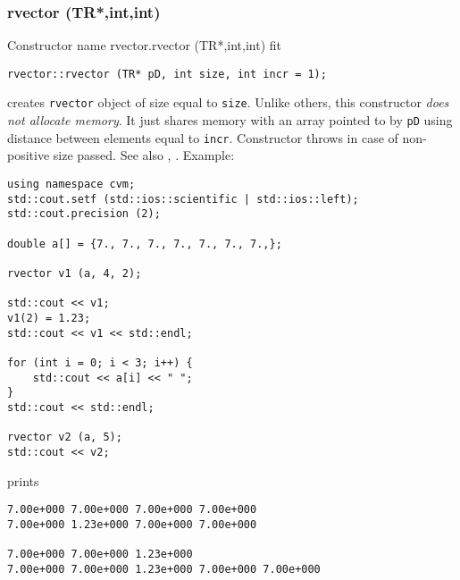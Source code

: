 \subsubsection{rvector (TR*,int,int)}
Constructor%
\pdfdest name {rvector.rvector (TR*,int,int)} fit
\begin{verbatim}
rvector::rvector (TR* pD, int size, int incr = 1);
\end{verbatim}
creates \verb"rvector" object of size equal to \verb"size".
Unlike others, this constructor \emph{does not allocate memory}.
It just shares memory with an array pointed to by \verb"pD" using
distance between elements equal to \verb"incr".
Constructor throws  
in case of non-positive size passed.
See also , .
Example:
\begin{Verbatim}
using namespace cvm;
std::cout.setf (std::ios::scientific | std::ios::left); 
std::cout.precision (2);

double a[] = {7., 7., 7., 7., 7., 7., 7.,};

rvector v1 (a, 4, 2);

std::cout << v1;
v1(2) = 1.23;
std::cout << v1 << std::endl;

for (int i = 0; i < 3; i++) {
    std::cout << a[i] << " ";
}
std::cout << std::endl;

rvector v2 (a, 5);
std::cout << v2;
\end{Verbatim}
prints
\begin{Verbatim}
7.00e+000 7.00e+000 7.00e+000 7.00e+000
7.00e+000 1.23e+000 7.00e+000 7.00e+000

7.00e+000 7.00e+000 1.23e+000
7.00e+000 7.00e+000 1.23e+000 7.00e+000 7.00e+000
\end{Verbatim}
\newpage



